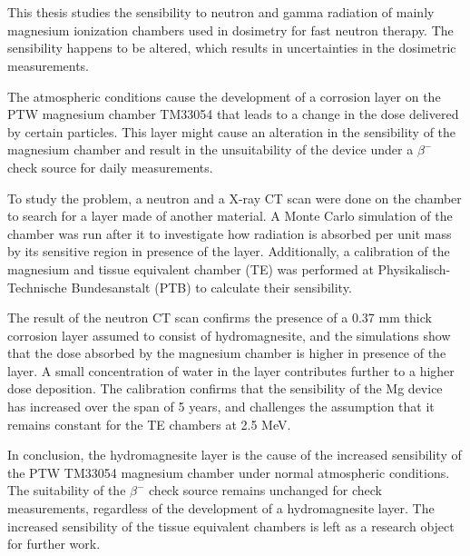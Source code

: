\chapter{\abstractname}

This thesis studies the sensibility to neutron and gamma radiation of mainly magnesium ionization chambers used in dosimetry for fast neutron therapy. The sensibility happens to be altered, which results in uncertainties in the dosimetric measurements.

The atmospheric conditions cause the development of a corrosion layer on the PTW magnesium chamber TM33054 that leads to a change in the dose delivered by certain particles. This layer might cause an alteration in the sensibility of the magnesium chamber and result in the unsuitability of the device under a $\beta^-$ check source for daily measurements.

To study the problem, a neutron and a X-ray CT scan were done on the chamber to search for a layer made of another material. A Monte Carlo simulation of the chamber was run after it to investigate how radiation is absorbed per unit mass by its sensitive region in presence of the layer. Additionally, a calibration of the magnesium and tissue equivalent chamber (TE) was performed at Physikalisch-Technische Bundesanstalt (PTB) to calculate their sensibility.

The result of the neutron CT scan confirms the presence of a 0.37 \unit{\milli\meter} thick corrosion layer assumed to consist of hydromagnesite, and the simulations show that the dose absorbed by the magnesium chamber is higher in presence of the layer. A small concentration of water in the layer contributes further to a higher dose deposition. The calibration confirms that the sensibility of the Mg device has increased over the span of 5 years, and challenges the assumption that it remains constant for the TE chambers at 2.5 \unit{\mega\electronvolt}. 

In conclusion, the hydromagnesite layer is the cause of the increased sensibility of the PTW TM33054 magnesium chamber under normal atmospheric conditions. The suitability of the $\beta^-$ check source remains unchanged for check measurements, regardless of the development of a hydromagnesite layer. The increased sensibility of the tissue equivalent chambers is left as a research object for further work.

\cleardoublepage{}
